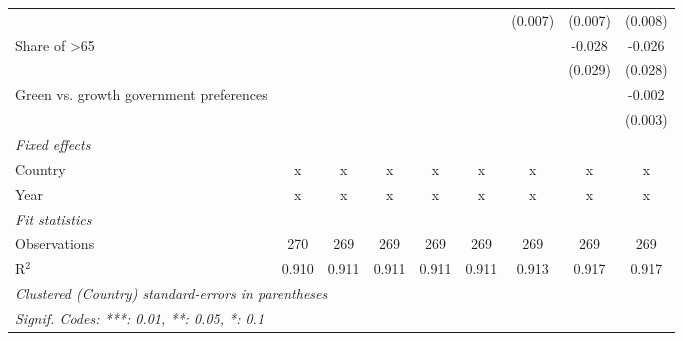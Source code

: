 \begin{table}[htbp]
\begin{tabular}{lcccccccc}
                                                &         &         &         &         &         & (0.007) & (0.007) & (0.008)\\   
      Share of >65                              &         &         &         &         &         &         & -0.028  & -0.026\\   
                                                &         &         &         &         &         &         & (0.029) & (0.028)\\   
      Green vs. growth government preferences   &         &         &         &         &         &         &         & -0.002\\   
                                                &         &         &         &         &         &         &         & (0.003)\\   
      \emph{Fixed effects}\\
      Country                                   & x       & x       & x       & x       & x       & x       & x       & x\\  
      Year                                      & x       & x       & x       & x       & x       & x       & x       & x\\  
      \midrule \emph{Fit statistics}\\
      Observations                              & 270     & 269     & 269     & 269     & 269     & 269     & 269     & 269\\  
      R$^2$                                     & 0.910   & 0.911   & 0.911   & 0.911   & 0.911   & 0.913   & 0.917   & 0.917\\  
      \midrule
      \multicolumn{9}{l}{\emph{Clustered (Country) standard-errors in parentheses}}\\
      \multicolumn{9}{l}{\emph{Signif. Codes: ***: 0.01, **: 0.05, *: 0.1}}\\
   \end{tabular}
\end{table}


